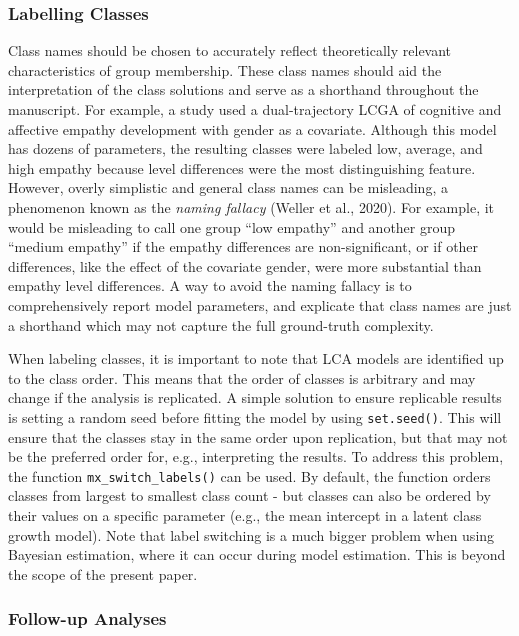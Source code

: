 \documentclass[
  ,man,floatsintext]{apa6}
\begin{document}
\hypertarget{labelling-classes}{%
\subsubsection{Labelling Classes}\label{labelling-classes}}

Class names should be chosen to accurately reflect theoretically relevant characteristics of group membership.
These class names should aid the interpretation of the class solutions and serve as a shorthand throughout the manuscript.
For example, a study used a dual-trajectory LCGA of cognitive and affective empathy development with gender as a covariate.
Although this model has dozens of parameters,
the resulting classes were labeled low, average, and high empathy because level differences were the most distinguishing feature.
However, overly simplistic and general class names can be misleading, a phenomenon known as the \emph{naming fallacy} (Weller et al., 2020).
For example, it would be misleading to call one group ``low empathy'' and another group ``medium empathy'' if the empathy differences are non-significant,
or if other differences, like the effect of the covariate gender, were more substantial than empathy level differences.
A way to avoid the naming fallacy is to comprehensively report model parameters,
and explicate that class names are just a shorthand which may not capture the full ground-truth complexity.

When labeling classes, it is important to note that LCA models are identified up to the class order.
This means that the order of classes is arbitrary and may change if the analysis is replicated.
A simple solution to ensure replicable results is setting a random seed before fitting the model by using \texttt{set.seed()}.
This will ensure that the classes stay in the same order upon replication,
but that may not be the preferred order for, e.g., interpreting the results.
To address this problem, the function \texttt{mx\_switch\_labels()} can be used.
By default, the function orders classes from largest to smallest class count - but classes can also be ordered by their values on a specific parameter (e.g., the mean intercept in a latent class growth model).
Note that label switching is a much bigger problem when using Bayesian estimation,
where it can occur during model estimation.
This is beyond the scope of the present paper.

\hypertarget{follow-up-analyses}{%
\subsubsection{Follow-up Analyses}\label{follow-up-analyses}}
\end{document}
